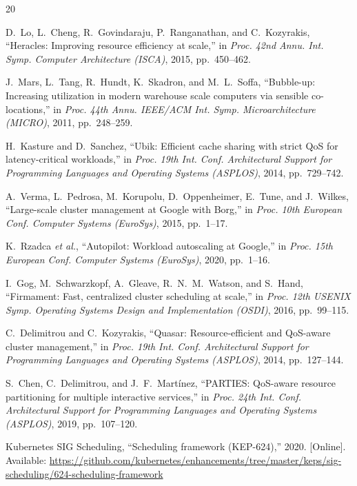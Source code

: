 \documentclass[10pt,conference,a4paper]{IEEEtran}
\begin{document}
\begin{thebibliography}{20}

D.~Lo, L.~Cheng, R.~Govindaraju, P.~Ranganathan, and C.~Kozyrakis,
``{Heracles}: Improving resource efficiency at scale,''
in \emph{Proc. 42nd Annu. Int. Symp. Computer Architecture (ISCA)}, 2015, pp.~450--462.


J.~Mars, L.~Tang, R.~Hundt, K.~Skadron, and M.~L.~Soffa,
``Bubble-up: Increasing utilization in modern warehouse scale computers via sensible co-locations,''
in \emph{Proc. 44th Annu. IEEE/ACM Int. Symp. Microarchitecture (MICRO)}, 2011, pp.~248--259.


H.~Kasture and D.~Sanchez,
``{Ubik}: Efficient cache sharing with strict {QoS} for latency-critical workloads,''
in \emph{Proc. 19th Int. Conf. Architectural Support for Programming Languages and Operating Systems (ASPLOS)}, 2014, pp.~729--742.


A.~Verma, L.~Pedrosa, M.~Korupolu, D.~Oppenheimer, E.~Tune, and J.~Wilkes,
``Large-scale cluster management at {Google} with {Borg},''
in \emph{Proc. 10th European Conf. Computer Systems (EuroSys)}, 2015, pp.~1--17.


K.~Rzadca \emph{et al.},
``{Autopilot}: Workload autoscaling at {Google},''
in \emph{Proc. 15th European Conf. Computer Systems (EuroSys)}, 2020, pp.~1--16.


I.~Gog, M.~Schwarzkopf, A.~Gleave, R.~N.~M.~Watson, and S.~Hand,
``{Firmament}: Fast, centralized cluster scheduling at scale,''
in \emph{Proc. 12th USENIX Symp. Operating Systems Design and Implementation (OSDI)}, 2016, pp.~99--115.


C.~Delimitrou and C.~Kozyrakis,
``{Quasar}: Resource-efficient and {QoS}-aware cluster management,''
in \emph{Proc. 19th Int. Conf. Architectural Support for Programming Languages and Operating Systems (ASPLOS)}, 2014, pp.~127--144.


S.~Chen, C.~Delimitrou, and J.~F.~Mart\'inez,
``{PARTIES}: {QoS}-aware resource partitioning for multiple interactive services,''
in \emph{Proc. 24th Int. Conf. Architectural Support for Programming Languages and Operating Systems (ASPLOS)}, 2019, pp.~107--120.


Kubernetes SIG Scheduling,
``Scheduling framework ({KEP}-624),'' 2020.
[Online]. Available: \url{https://github.com/kubernetes/enhancements/tree/master/keps/sig-scheduling/624-scheduling-framework}



\end{thebibliography}
\end{document}
